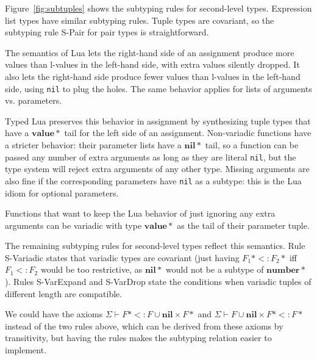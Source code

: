 \documentclass[10pt]{sigplanconf}
\newcommand{\Value}{\mathbf{value}}
\newcommand{\Nil}{\mathbf{nil}}
\newcommand{\Number}{\mathbf{number}}
\newcommand{\senv}{\Sigma}
\newcommand{\subtype}{<:}
\begin{document}
Figure~\ref{fig:subtuples} shows the subtyping rules for
second-level types. Expression list types have similar
subtyping rules. Tuple types are covariant, so the subtyping rule {\sc S-Pair} for pair types is straightforward.

The semantics of Lua lets the right-hand side of an assignment
produce more values than l-values in the left-hand side,
with extra values silently dropped. It also lets the
right-hand side produce fewer values than l-values in the
left-hand side, using {\tt nil} to plug the holes. The
same behavior applies for lists of arguments vs. parameters.

Typed Lua preserves this behavior in assignment by synthesizing
tuple types that have a $\Value{*}$ tail for the left side
of an assignment. Non-variadic functions have a stricter
behavior: their parameter lists have a $\Nil{*}$ tail, so
a function can be passed any number of extra arguments
as long as they are literal {\tt nil}, but the type system will
reject extra arguments of any other type. Missing arguments
are also fine if the corresponding parameters have {\tt nil}
as a subtype: this is the Lua idiom for optional parameters.

Functions that want to keep the Lua behavior of just ignoring
any extra arguments can be variadic with type $\Value{*}$ as
the tail of their parameter tuple.

The remaining subtyping rules for second-level types
reflect this semantics. Rule {\sc S-Variadic} states
that variadic types are covariant (just having $F_1{*} \subtype F_2{*}$ iff $F_1 \subtype F_2$ would be too restrictive,
as $\Nil{*}$ would not be a subtype of $\Number{*}$).
Rules {\sc S-VarExpand} and {\sc S-VarDrop} state the
conditions when variadic tuples of different length are
compatible.

We could have the axioms $\senv \vdash F{*} \subtype F \cup \Nil \times F{*}$ and $\senv \vdash F \cup \Nil \times F{*}  \subtype F{*}$ instead of the two rules above, which can be derived
from these axioms by transitivity, but having the rules makes
the subtyping relation easier to implement.
\end{document}
